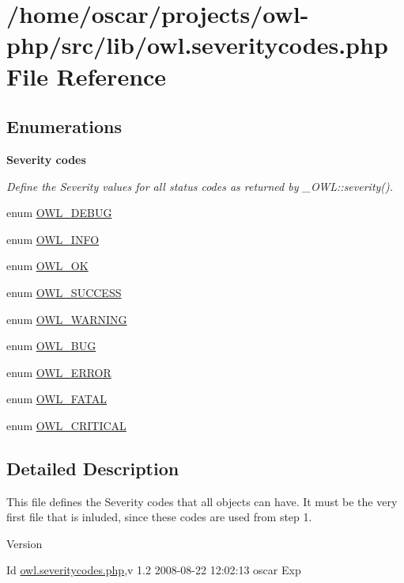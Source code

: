 \section{/home/oscar/projects/owl-\/php/src/lib/owl.severitycodes.php File Reference}
\label{owl_8severitycodes_8php}
\subsection*{Enumerations}
\begin{Indent}{\bf Severity codes}\par
{\em \label{_amgrp0bfaa46a9f56b89183011b68383e13d0}
 Define the Severity values for all status codes as returned by \_\-OWL::severity(). }\begin{DoxyCompactItemize}
\item 
enum \hyperlink{owl_8severitycodes_8php_adf6a439e74801dd83160f085e9af5546}{OWL\_\-DEBUG} 
\item 
enum \hyperlink{owl_8severitycodes_8php_a139328861128689f2f4def6a399d9057}{OWL\_\-INFO} 
\item 
enum \hyperlink{owl_8severitycodes_8php_abc72c053cfd10025fe57797c41eab18e}{OWL\_\-OK} 
\item 
enum \hyperlink{owl_8severitycodes_8php_a96223f06ba27bf5cbefa6e9d702897c2}{OWL\_\-SUCCESS} 
\item 
enum \hyperlink{owl_8severitycodes_8php_ace886152e2e86cd2e91cb833fd495adb}{OWL\_\-WARNING} 
\item 
enum \hyperlink{owl_8severitycodes_8php_a97e9838587d4386a48d7e40020bf0a7f}{OWL\_\-BUG} 
\item 
enum \hyperlink{owl_8severitycodes_8php_ab57d46c4dff0628f7f46aa11db9325c9}{OWL\_\-ERROR} 
\item 
enum \hyperlink{owl_8severitycodes_8php_a4c27106ebf80027ef1ebf953ed172e76}{OWL\_\-FATAL} 
\item 
enum \hyperlink{owl_8severitycodes_8php_a4628d2e3b0d08692a62a1b8cad05465b}{OWL\_\-CRITICAL} 
\end{DoxyCompactItemize}
\end{Indent}


\subsection{Detailed Description}
This file defines the Severity codes that all objects can have. It must be the very first file that is inluded, since these codes are used from step 1. \begin{DoxyVersion}{Version}

\end{DoxyVersion}
\begin{DoxyParagraph}{Id}
\hyperlink{owl_8severitycodes_8php}{owl.severitycodes.php},v 1.2 2008-\/08-\/22 12:02:13 oscar Exp 
\end{DoxyParagraph}


